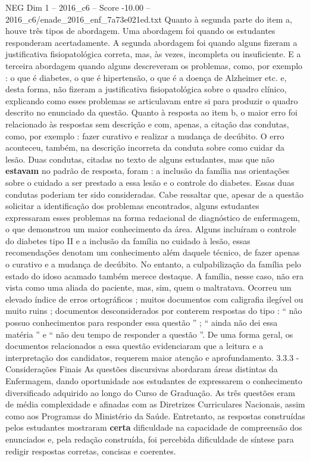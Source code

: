 \begin{textsample}{NEG Dim 1 – 2016\_c6 – Score -10.00 – 2016\_c6/enade\_2016\_enf\_7a73e021ed.txt}
Quanto à segunda parte do item a, houve três tipos de abordagem.
Uma abordagem foi quando os estudantes responderam acertadamente.
A segunda abordagem foi quando alguns fizeram a justificativa fisiopatológica correta, mas, às vezes, incompleta ou insuficiente.
E a terceira abordagem quando alguns descreveram os problemas, como, por exemplo : o que é diabetes, o que é hipertensão, o que é a doença de Alzheimer etc. e, desta forma, não fizeram a justificativa fisiopatológica sobre o quadro clínico, explicando como esses problemas se articulavam entre si para produzir o quadro descrito no enunciado da questão.
Quanto à resposta ao item b, o maior erro foi relacionado às respostas sem descrição e com, apenas, a citação das condutas, como, por exemplo : fazer curativo e realizar a mudança de decúbito.
O erro aconteceu, também, na descrição incorreta da conduta sobre como cuidar da lesão.
Duas condutas, citadas no texto de alguns estudantes, mas que não \textbf{estavam} no padrão de resposta, foram : a inclusão da família nas orientações sobre o cuidado a ser prestado a essa lesão e o controle do diabetes.
Essas duas condutas poderiam ter sido consideradas.
Cabe ressaltar que, apesar de a questão solicitar a identificação dos problemas encontrados, alguns estudantes expressaram esses problemas na forma redacional de diagnóstico de enfermagem, o que demonstrou um maior conhecimento da área.
Alguns incluíram o controle do diabetes tipo II e a inclusão da família no cuidado à lesão, essas recomendações denotam um conhecimento além daquele técnico, de fazer apenas o curativo e a mudança de decúbito.
No entanto, a culpabilização da família pelo estado do idoso acamado também merece destaque.
A família, nesse caso, não era vista como uma aliada do paciente, mas, sim, quem o maltratava.
Ocorreu um elevado índice de erros ortográficos ; muitos documentos com caligrafia ilegível ou muito ruins ; documentos desconsiderados por conterem respostas do tipo : “ não possuo conhecimentos para responder essa questão ” ; “ ainda não dei essa matéria ” e “ não deu tempo de responder a questão ”.
De uma forma geral, os documentos relacionados a essa questão evidenciaram que a leitura e a interpretação dos candidatos, requerem maior atenção e aprofundamento. 3.3.3 - Considerações Finais As questões discursivas abordaram áreas distintas da Enfermagem, dando oportunidade aos estudantes de expressarem o conhecimento diversificado adquirido ao longo do Curso de Graduação.
As três questões eram de média complexidade e afinadas com as Diretrizes Curriculares Nacionais, assim como aos Programas do Ministério da Saúde.
Entretanto, as respostas construídas pelos estudantes mostraram \textbf{certa} dificuldade na capacidade de compreensão dos enunciados e, pela redação construída, foi percebida dificuldade de síntese para redigir respostas corretas, concisas e coerentes.

\end{textsample}
